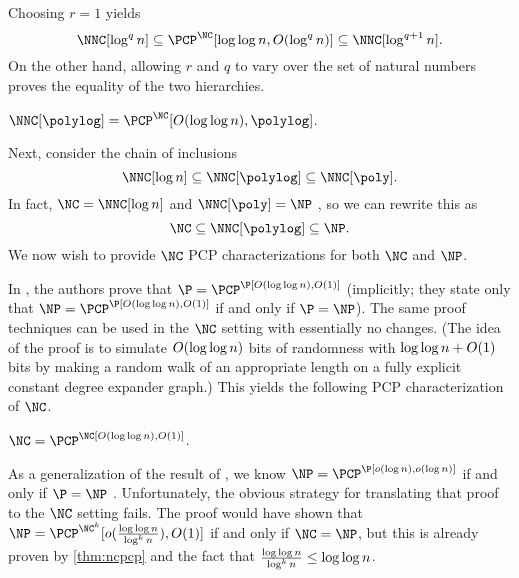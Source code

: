 Choosing $r = 1$ yields
$$
\NNC[\log^q n] \subseteq \PCP^{\NC}[\loglog n, O(\log^q n)] \subseteq \NNC[\log^{q + 1} n].
$$
On the other hand, allowing $r$ and $q$ to vary over the set of natural numbers proves the equality of the two hierarchies.

\begin{corollary}\label{cor:polylogeq}
  $\NNC[\polylog] = \PCP^{\NC}[O(\loglog n), \polylog]$.
\end{corollary}

Next, consider the chain of inclusions
\begin{equation*}
  \NNC[\log n] \subseteq \NNC[\polylog] \subseteq \NNC[\poly].
\end{equation*}
In fact, $\NC = \NNC[\log n]$ and $\NNC[\poly] = \NP$ \autocite{wolf94}, so we can rewrite this as
\begin{equation}\label{eq:chain}
  \NC \subseteq \NNC[\polylog] \subseteq \NP.
\end{equation}
We now wish to provide $\NC$ PCP characterizations for both $\NC$ and $\NP$.

In \autocite{fs96}, the authors prove that $\P = \PCP^\P[O(\loglog n), O(1)]$ (implicitly; they state only that $\NP = \PCP^\P[O(\loglog n), O(1)]$ if and only if $\P = \NP$).
The same proof techniques can be used in the $\NC$ setting with essentially no changes.
(The idea of the proof is to simulate $O(\log\log n)$ bits of randomness with $\log\log n + O(1)$ bits by making a random walk of an appropriate length on a fully explicit constant degree expander graph.)
This yields the following PCP characterization of $\NC$.

\begin{theorem}\label{thm:ncpcp}
  $\NC = \PCP^\NC[O(\loglog n), O(1)]$.
\end{theorem}

As a generalization of the result of \autocite{fs96}, we know $\NP = \PCP^\P[o(\log n), o(\log n)]$ if and only if $\P = \NP$ \autocites{as98}{fglss91}.
Unfortunately, the obvious strategy for translating that proof to the $\NC$ setting fails.
The proof would have shown that $\NP = \PCP^{\NC^k}[o(\frac{\loglog n}{\log^k n}), O(1)]$ if and only if $\NC = \NP$, but this is already proven by \autoref{thm:ncpcp} and the fact that $\frac{\log\log n}{\log^k n} \leq \log\log n$.

